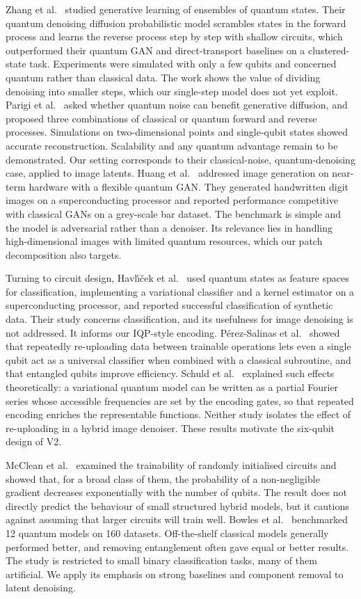 Zhang et al.~\cite{zhang} studied generative learning of ensembles of quantum states. Their quantum denoising diffusion probabilistic model scrambles states in the forward process and learns the reverse process step by step with shallow circuits, which outperformed their quantum GAN and direct-transport baselines on a clustered-state task. Experiments were simulated with only a few qubits and concerned quantum rather than classical data. The work shows the value of dividing denoising into smaller steps, which our single-step model does not yet exploit. Parigi et al.~\cite{parigi} asked whether quantum noise can benefit generative diffusion, and proposed three combinations of classical or quantum forward and reverse processes. Simulations on two-dimensional points and single-qubit states showed accurate reconstruction. Scalability and any quantum advantage remain to be demonstrated. Our setting corresponds to their classical-noise, quantum-denoising case, applied to image latents. Huang et al.~\cite{huang} addressed image generation on near-term hardware with a flexible quantum GAN. They generated handwritten digit images on a superconducting processor and reported performance competitive with classical GANs on a grey-scale bar dataset. The benchmark is simple and the model is adversarial rather than a denoiser. Its relevance lies in handling high-dimensional images with limited quantum resources, which our patch decomposition also targets.

Turning to circuit design, Havl\'{\i}\v{c}ek et al.~\cite{havlicek} used quantum states as feature spaces for classification, implementing a variational classifier and a kernel estimator on a superconducting processor, and reported successful classification of synthetic data. Their study concerns classification, and its usefulness for image denoising is not addressed. It informs our IQP-style encoding. P\'erez-Salinas et al.~\cite{salinas} showed that repeatedly re-uploading data between trainable operations lets even a single qubit act as a universal classifier when combined with a classical subroutine, and that entangled qubits improve efficiency. Schuld et al.~\cite{schuld} explained such effects theoretically: a variational quantum model can be written as a partial Fourier series whose accessible frequencies are set by the encoding gates, so that repeated encoding enriches the representable functions. Neither study isolates the effect of re-uploading in a hybrid image denoiser. These results motivate the six-qubit design of V2.

McClean et al.~\cite{mcclean} examined the trainability of randomly initialised circuits and showed that, for a broad class of them, the probability of a non-negligible gradient decreases exponentially with the number of qubits. The result does not directly predict the behaviour of small structured hybrid models, but it cautions against assuming that larger circuits will train well. Bowles et al.~\cite{bowles} benchmarked 12 quantum models on 160 datasets. Off-the-shelf classical models generally performed better, and removing entanglement often gave equal or better results. The study is restricted to small binary classification tasks, many of them artificial. We apply its emphasis on strong baselines and component removal to latent denoising.

